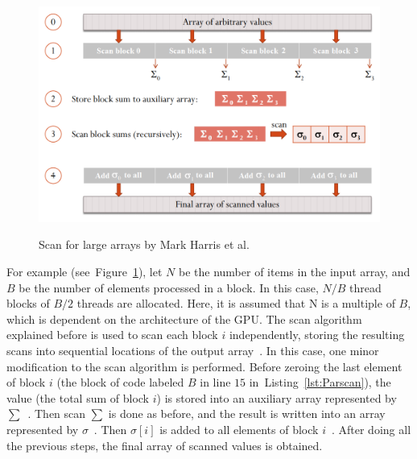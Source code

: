 \documentclass[Ingles]{ic-tese-v1}
\newcommand{\rfig}[1]{Figure~\ref{fig:#1}}
\newcommand{\rlst}[1]{Listing~\ref{lst:#1}}
\begin{document}
\begin{figure}[t]
	\centering
	\caption{Scan for large arrays by Mark Harris et al.}
	\includegraphics[scale=0.5]{images/largescan.png}
	\label{fig:largescan}
\end{figure}

For example (see~\rfig{largescan}), let $N$ be the number of items in
the input array, and $B$ be the number of elements processed in a block. In this case,
$N/B$ thread blocks of $B/2$ threads are allocated. Here,  it is assumed that N
is a multiple of $B$, which is dependent on the architecture  of the GPU. The scan
algorithm explained before is used to scan each block $i$ independently,
storing the resulting scans into sequential locations of the output
array~. In this case,  one minor modification to the scan algorithm is performed.
Before zeroing the last element of block $i$ (the block of code labeled $B$ in
line $15$ in~\rlst{Parscan}), the value (the total sum of block
$i$) is stored into an auxiliary array represented by $\sum$~. Then scan $\sum$
is done as before, and the  result is written into an array represented by
$\sigma$~. Then $\sigma[i]$ is added to all elements of block
$i$~. After doing all the previous steps, the final
array of scanned values is obtained.
\end{document}
